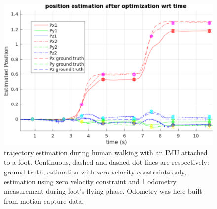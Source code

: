 
\begin{figure}[tb]
\centering
\includegraphics[scale=0.42]{figures/Result_position}
\caption{ 
trajectory estimation during human walking with an IMU attached to a foot. Continuous, dashed and dashed-dot lines are respectively: ground truth, 
estimation with zero velocity constraints only, estimation using zero velocity constraint and 1 odometry measurement during foot's flying phase. Odometry was here built from motion capture data.
}
\label{fig:forward_walk_IRI}
\end{figure}

